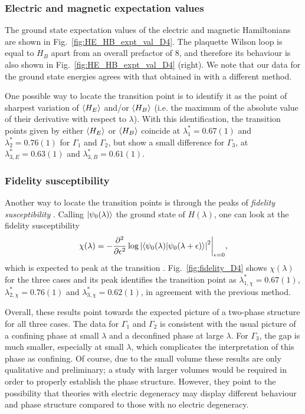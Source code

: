 \subsubsection*{Electric and magnetic expectation values}

The ground state expectation values of the electric and magnetic Hamiltonians are shown in Fig.~\ref{fig:HE_HB_expt_val_D4}.
The plaquette Wilson loop is equal to $H_B$ apart from an overall prefactor of $8$, and therefore its behaviour is also shown in Fig.~\ref{fig:HE_HB_expt_val_D4} (right).
We note that our data for the ground state energies agrees with that obtained in \cite{marchesethesis} with a different method.

One possible way to locate the transition point is to identify it as the point of sharpest variation of $\expval{H_E}$ and/or $\expval{H_B}$ (i.e. the maximum of the absolute value of their derivative with respect to $\lambda$).
With this identification, the transition points given by either $\expval{H_E}$ or $\expval{H_B}$ coincide at $\lambda_1^* = 0.67(1)$ and $\lambda_2^* = 0.76(1)$ for $\Gamma_1$ and $\Gamma_2$, but show a small difference for $\Gamma_3$, at $\lambda_{3,E}^* = 0.63(1)$ and $\lambda_{3,B}^* = 0.61(1)$.

\subsubsection*{Fidelity susceptibility}

Another way to locate the transition points is through the peaks of \emph{fidelity susceptibility} \cite{you2007fidelity, wang2016fidelity}.
Calling $\ket{\psi_0(\lambda)}$ the ground state of $H(\lambda)$, one can look at the fidelity susceptibility
\cite{you2007fidelity}
\begin{equation}
    \chi(\lambda) = -\frac{\partial^2}{\partial \epsilon^2} \log \abs{\expval{\psi_0(\lambda) | \psi_0(\lambda+\epsilon) }}^2 \bigg\lvert_{\epsilon=0},
\end{equation}
which is expected to peak at the transition \cite{wang2016fidelity}.
Fig.~\ref{fig:fidelity_D4} shows $\chi(\lambda)$ for the three cases and its peak identifies the transition point as $\lambda_{1, \chi}^*=0.67(1)$, $\lambda_{2, \chi}^*=0.76(1)$ and $\lambda_{3, \chi}^*=0.62(1)$, in agreement with the previous method.

\bigbreak

Overall, these results point towards the expected picture of a two-phase structure for all three cases.
The data for $\Gamma_1$ and $\Gamma_2$ is consistent with the usual picture of a confining phase at small $\lambda$ and a deconfined phase at large $\lambda$.
For $\Gamma_3$, the gap is much smaller, especially at small $\lambda$, which complicates the interpretation of this phase as confining.
Of course, due to the small volume these results are only qualitative and preliminary; a study with larger volumes would be required in order to properly establish the phase structure.
However, they point to the possibility that theories with electric degeneracy may display different behaviour and phase structure compared to those with no electric degeneracy.

